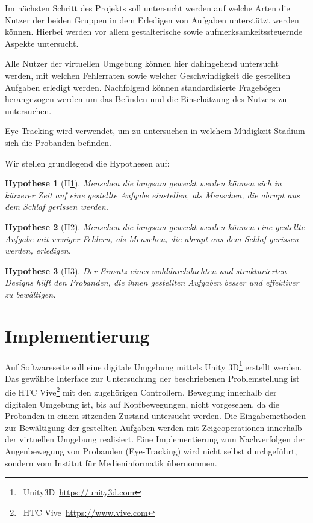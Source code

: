\documentclass[a4paper, 11pt]{article}
\newtheorem{hyp}{Hypothese}
\begin{document}
Im nächsten Schritt des Projekts soll untersucht werden auf welche Arten die Nutzer der beiden Gruppen in dem Erledigen von Aufgaben unterstützt werden können. Hierbei werden vor allem gestalterische sowie aufmerksamkeitssteuernde Aspekte untersucht. 

Alle Nutzer der virtuellen Umgebung können hier dahingehend untersucht werden, mit welchen Fehlerraten sowie welcher Geschwindigkeit die gestellten Aufgaben erledigt werden. Nachfolgend können standardisierte Fragebögen herangezogen werden um das Befinden und die Einschätzung des Nutzers zu untersuchen.

Eye-Tracking wird verwendet, um zu untersuchen in welchem Müdigkeit-Stadium sich die Probanden befinden.
\newline

Wir stellen grundlegend die Hypothesen auf:
\begin{hyp}[H\ref{hyp:schneller}]\label{hyp:schneller}
	Menschen die langsam geweckt werden können sich in kürzerer Zeit auf eine gestellte Aufgabe einstellen, als Menschen, die abrupt aus dem Schlaf gerissen werden.
\end{hyp}

\begin{hyp}[H\ref{hyp:erfolgreicher}]\label{hyp:erfolgreicher}
	Menschen die langsam geweckt werden können eine gestellte Aufgabe mit weniger Fehlern, als Menschen, die abrupt aus dem Schlaf gerissen werden, erledigen.
\end{hyp}

\begin{hyp}[H\ref{hyp:gestaltung}]\label{hyp:gestaltung}
	Der Einsatz eines wohldurchdachten und strukturierten Designs hilft den Probanden, die ihnen gestellten Aufgaben besser und effektiver zu bewältigen. 
\end{hyp}

\section*{Implementierung}
Auf Softwareseite soll eine digitale Umgebung mittels Unity 3D\footnote{~Unity3D~\url{https://unity3d.com}} erstellt werden. Das gewählte Interface zur Untersuchung der beschriebenen Problemstellung ist die HTC Vive\footnote{~HTC Vive~\url{https://www.vive.com}} mit den zugehörigen Controllern. Bewegung innerhalb der digitalen Umgebung ist, bis auf Kopfbewegungen, nicht vorgesehen, da die Probanden in einem sitzenden Zustand untersucht werden. Die Eingabemethoden zur Bewältigung der gestellten Aufgaben werden mit Zeigeoperationen innerhalb der virtuellen Umgebung realisiert. Eine Implementierung zum Nachverfolgen der Augenbewegung von Probanden (Eye-Tracking) wird nicht selbst durchgeführt, sondern vom Institut für Medieninformatik übernommen. 
\end{document}
